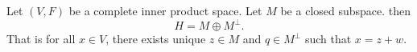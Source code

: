 
\begin{prop}
Let $(V, F)$ be a complete
inner product space.
Let $M$ be a closed subspace.
then
\[
  H = M \oplus M^{\perp}.
\]
That is for all $x \in V$,
there exists unique
$z \in M$ and $q \in M^{\perp}$
such that $x = z + w$.
\end{prop}

